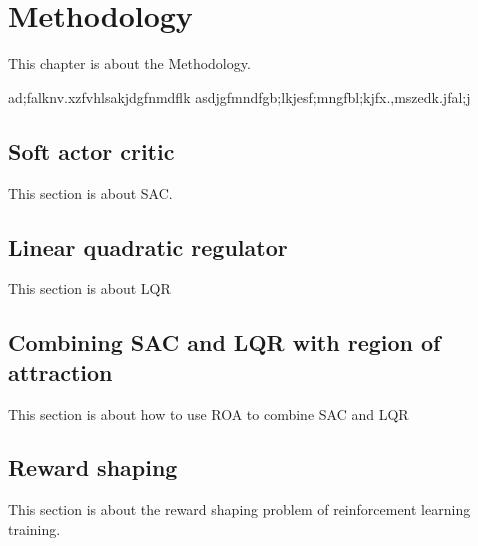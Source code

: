 \chapter{Methodology}
This chapter is about the Methodology.

ad;falknv.xzfvhlsakjdgfnmdflk asdjgfmndfgb;lkjesf;mngfbl;kjfx.,mszedk.jfal;j

\section{Soft actor critic}
This section is about SAC.

\section{Linear quadratic regulator}
This section is about LQR

\section{Combining SAC and LQR with region of attraction}
This section is about how to use ROA to combine SAC and LQR

\section{Reward shaping}
This section is about the reward shaping problem of reinforcement learning training.


\cleardoublepage
